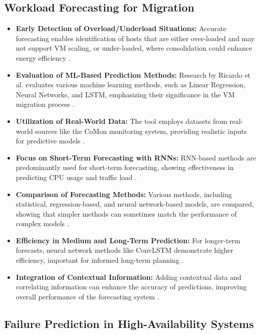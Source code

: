 \subsection{Workload Forecasting for Migration}

\begin{itemize}
    \item \textbf{Early Detection of Overload/Underload Situations:} Accurate forecasting enables identification of hosts that are either over-loaded and may not support VM scaling, or under-loaded, where consolidation could enhance energy efficiency \cite{Ricardo2021, Li2019}.
    \item \textbf{Evaluation of ML-Based Prediction Methods:} Research by Ricardo et al. evaluates various machine learning methods, such as Linear Regression, Neural Networks, and LSTM, emphasizing their significance in the VM migration process \cite{Ricardo2021, Duggan2017}.
    \item \textbf{Utilization of Real-World Data:} The tool employs datasets from real-world sources like the CoMon monitoring system, providing realistic inputs for predictive models \cite{Park2006, Gill2022}.
    \item \textbf{Focus on Short-Term Forecasting with RNNs:} RNN-based methods are predominantly used for short-term forecasting, showing effectiveness in predicting CPU usage and traffic load \cite{Mason2018, Duggan2017}.
    \item \textbf{Comparison of Forecasting Methods:} Various methods, including statistical, regression-based, and neural network-based models, are compared, showing that simpler methods can sometimes match the performance of complex models \cite{Nguyen2019, Hieu2020}.
    \item \textbf{Efficiency in Medium and Long-Term Prediction:} For longer-term forecasts, neural network methods like ConvLSTM demonstrate higher efficiency, important for informed long-term planning \cite{Bega2020, Fiandrino2020}.
    \item \textbf{Integration of Contextual Information:} Adding contextual data and correlating information can enhance the accuracy of predictions, improving overall performance of the forecasting system \cite{Kim2019, Bega2020}.
\end{itemize}

\subsection{Failure Prediction in High-Availability Systems}

